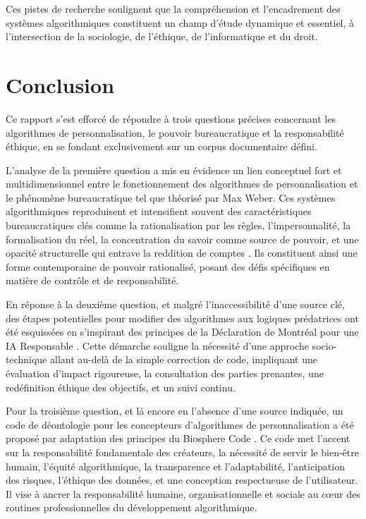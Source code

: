 \documentclass[10pt, twocolumn]{article}
\begin{document}
Ces pistes de recherche soulignent que la compréhension et l'encadrement des systèmes algorithmiques constituent un champ d'étude dynamique et essentiel, à l'intersection de la sociologie, de l'éthique, de l'informatique et du droit.

\section{Conclusion}

Ce rapport s'est efforcé de répondre à trois questions précises concernant les algorithmes de personnalisation, le pouvoir bureaucratique et la responsabilité éthique, en se fondant exclusivement sur un corpus documentaire défini.

L'analyse de la première question a mis en évidence un lien conceptuel fort et multidimensionnel entre le fonctionnement des algorithmes de personnalisation et le phénomène bureaucratique tel que théorisé par Max Weber. Ces systèmes algorithmiques reproduisent et intensifient souvent des caractéristiques bureaucratiques clés comme la rationalisation par les règles, l'impersonnalité, la formalisation du réel, la concentration du savoir comme source de pouvoir, et une opacité structurelle qui entrave la reddition de comptes \citep{Serpa2019, Weber1922}. Ils constituent ainsi une forme contemporaine de pouvoir rationalisé, posant des défis spécifiques en matière de contrôle et de responsabilité.

En réponse à la deuxième question, et malgré l'inaccessibilité d'une source clé, des étapes potentielles pour modifier des algorithmes aux logiques prédatrices ont été esquissées en s'inspirant des principes de la Déclaration de Montréal pour une IA Responsable \citep{Montreal2018}. Cette démarche souligne la nécessité d'une approche socio-technique allant au-delà de la simple correction de code, impliquant une évaluation d'impact rigoureuse, la consultation des parties prenantes, une redéfinition éthique des objectifs, et un suivi continu.

Pour la troisième question, et là encore en l'absence d'une source indiquée, un code de déontologie pour les concepteurs d'algorithmes de personnalisation a été proposé par adaptation des principes du Biosphere Code \citep{Biosphere2015}. Ce code met l'accent sur la responsabilité fondamentale des créateurs, la nécessité de servir le bien-être humain, l'équité algorithmique, la transparence et l'adaptabilité, l'anticipation des risques, l'éthique des données, et une conception respectueuse de l'utilisateur. Il vise à ancrer la responsabilité humaine, organisationnelle et sociale au cœur des routines professionnelles du développement algorithmique.
\end{document}
